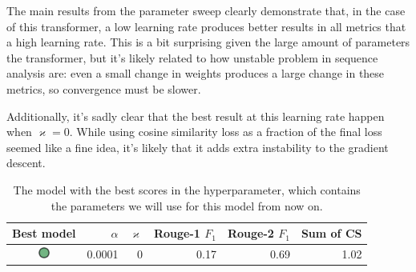 The main results from the parameter sweep clearly demonstrate that, in the case of this transformer, a low learning rate produces better results in all metrics that a high learning rate.
This is a bit surprising given the large amount of parameters the transformer, but it's likely related to how unstable problem in sequence analysis are: even a small change in weights produces a large change in these metrics, so convergence must be slower.

Additionally, it's sadly clear that the best result at this learning rate happen when $\varkappa = 0$.
While using cosine similarity loss as a fraction of the final loss seemed like a fine idea, it's likely that it adds extra instability to the gradient descent.

\begin{table}[h]
	\centering
	\begin{tabular}{c | r r | r r r}
		\toprule
			Best model & $\alpha$ & $\varkappa$ & Rouge-1 $F_1$ & Rouge-2 $F_1$ & Sum of CS \\
		\midrule
			\includegraphics[width=1em,height=1em]{green_circle.png} & 0.0001 & 0 & 0.17 & 0.69 & 1.02 \\
		\bottomrule
	\end{tabular}
	\caption{The model with the best scores in the hyperparameter, which contains the parameters we will use for this model from now on.}

\end{table}
